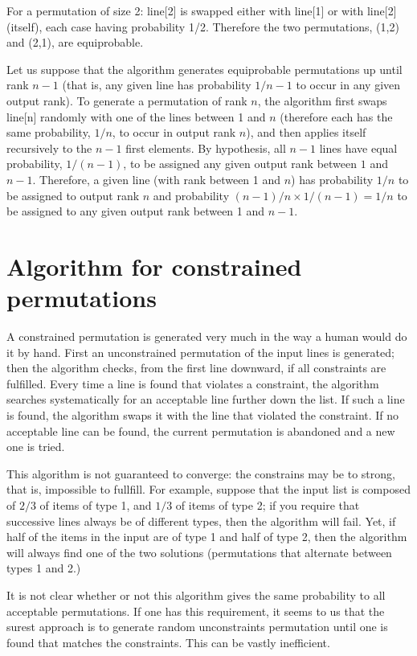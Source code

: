\documentclass[doc]{apa}
\begin{document}
For a permutation of size 2: line[2] is swapped either with line[1] or with
line[2] (itself), each case having probability 1/2. Therefore the two
permutations, (1,2) and (2,1), are equiprobable.
 
Let us suppose that the algorithm generates equiprobable permutations up until
rank $n-1$ (that is, any given line has probability $1/n-1$ to occur in any
given output rank). To generate a permutation of rank $n$, the algorithm first
swaps line[n] randomly with one of the lines between 1 and $n$ (therefore each
has the same probability, $1/n$, to occur in output rank $n$), and then
applies itself recursively to the $n-1$ first elements. By hypothesis, all
$n-1$ lines have equal probability, $1/(n-1)$, to be assigned any given output
rank between $1$ and $n-1$.  Therefore, a given line (with rank between 1 and
$n$) has probability $1/n$ to be assigned to output rank $n$ and probability
$(n-1)/n \times 1/(n-1)=1/n$ to be assigned to any given output rank between 1
and $n-1$.

\section*{Algorithm for constrained permutations}
 
A constrained permutation is generated very much in the way a human
would do it by hand. First an unconstrained permutation of the input
lines is generated; then the algorithm checks, from the first line
downward, if all constraints are fulfilled. Every time a line is found
that violates a constraint, the algorithm searches systematically for
an acceptable line further down the list. If such a line is found,
the algorithm swaps it with the line that violated the constraint. If
no acceptable line can be found, the current permutation is abandoned
and a new one is tried. 

This algorithm is not guaranteed to converge: the constrains may be to
strong, that is, impossible to fullfill. For example, suppose that the
input list is composed of $2/3$ of items of type 1, and $1/3$ of items
of type 2; if you require that successive lines always be of different
types, then the algorithm will fail. Yet, if half of the items in the
input are of type 1 and half of type 2, then the algorithm will always
find one of the two solutions (permutations that alternate between
types 1 and 2.)

It is not clear whether or not this algorithm gives the same probability to
all acceptable permutations. If one has this requirement, it seems to us that
the surest approach is to generate random unconstraints permutation until one
is found that matches the constraints. This can be vastly inefficient. 
\end{document}
